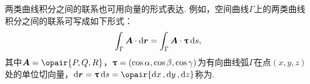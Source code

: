 两类曲线积分之间的联系也可用向量的形式表达.
例如，空间曲线\(\Gamma\)上的两类曲线积分之间的联系可写成如下形式：
\begin{equation}\label{equation:线积分与面积分.空间曲线上两类曲线积分之间的联系的向量形式}
\int_\Gamma{\boldsymbol{A} \cdot \dd{\boldsymbol{r}}}
= \int_\Gamma{\boldsymbol{A} \cdot \boldsymbol{\uptau} \dd{s}},
\end{equation}其中\(\vb{A}=\opair{P,Q,R}\)，\(\boldsymbol{\uptau}=(\cos\alpha,\cos\beta,\cos\gamma)\)为有向曲线弧\(\Gamma\)在点\((x,y,z)\)处的单位切向量，\(\dd{\vb{r}}=\vb{\tau}\dd{s}=\opair{\dd{x},\dd{y},\dd{z}}\)称为.
